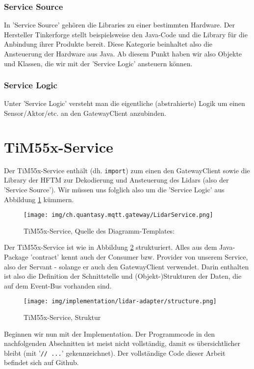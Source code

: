 \subsubsection{Service Source}
In 'Service Source' gehören die Libraries zu einer bestimmten Hardware. Der Hersteller Tinkerforge\cite{tinkerforge-gmbh} stellt beispielsweise den Java-Code und die Library für die Anbindung ihrer Produkte bereit. Diese Kategorie beinhaltet also die Ansteuerung der Hardware aus Java. Ab diesem Punkt haben wir also Objekte und Klassen, die wir mit der 'Service Logic' ansteuern können.
\subsubsection{Service Logic}
Unter 'Service Logic' versteht man die eigentliche (abstrahierte) Logik um einen Sensor/Aktor/etc. an den GatewayClient anzubinden.


\section{TiM55x-Service}
Der TiM55x-Service enthält (dh. \verb|import|) zum einen den GatewayClient sowie die Library der HFTM zur Dekodierung und Ansteuerung des Lidars (also der 'Service Source'). Wir müssen uns folglich also um die 'Service Logic' aus Abbildung \ref{fig:lidarservice} kümmern.
\begin{figure}[H]
	\centering
	\texttt{[image: img/ch.quantasy.mqtt.gateway/LidarService.png]}
	\caption{TiM55x-Service, Quelle des Diagramm-Templates: \cite{ch.quantasy.mqtt.gateway}}
	\label{fig:lidarservice}
\end{figure}

Der TiM55x-Service ist wie in Abbildung \ref{fig:structure_lidarservice} strukturiert. Alles aus dem Java-Package 'contract' kennt auch der Consumer bzw. Provider von unserem Service, also der Servant - solange er auch den GatewayClient verwendet. Darin enthalten ist also die Definition der Schnittstelle und (Objekt-)Strukturen der Daten, die auf dem Event-Bus vorhanden sind.
\begin{figure}[H]
	\centering
	\texttt{[image: img/implementation/lidar-adapter/structure.png]}
	\caption{TiM55x-Service, Struktur}
	\label{fig:structure_lidarservice}
\end{figure}

Beginnen wir nun mit der Implementation. Der Programmcode in den nachfolgenden Abschnitten ist meist nicht vollständig, damit es übersichtlicher bleibt (mit '\verb|// ...|' gekennzeichnet). Der vollständige Code dieser Arbeit befindet sich auf Github\cite{github-thesis}. \\
